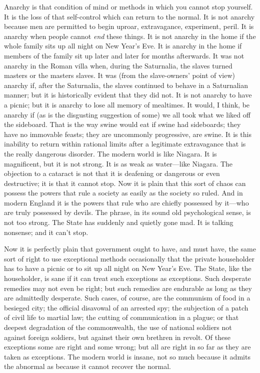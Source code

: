 \documentclass{book}
\begin{document}
Anarchy is that condition of mind or methods in which you cannot stop yourself. It is the loss of that self-control which can return to the normal. It is not anarchy because men are permitted to begin uproar, extravagance, experiment, peril. It is anarchy when people cannot \emph{end} these things. It is not anarchy in the home if the whole family sits up all night on New Year’s Eve. It is anarchy in the home if members of the family sit up later and later for months afterwards. It was not anarchy in the Roman villa when, during the Saturnalia, the slaves turned masters or the masters slaves. It was (from the slave-owners’ point of view) anarchy if, after the Saturnalia, the slaves continued to behave in a Saturnalian manner; but it is historically evident that they did not. It is not anarchy to have a picnic; but it is anarchy to lose all memory of mealtimes. It would, I think, be anarchy if (as is the disgusting suggestion of some) we all took what we liked off the sideboard. That is the way swine would eat if swine had sideboards; they have no immovable feasts; they are uncommonly progressive, are swine. It is this inability to return within rational limits after a legitimate extravagance that is the really dangerous disorder. The modern world is like Niagara. It is magnificent, but it is not strong. It is as weak as water—like Niagara. The objection to a cataract is not that it is deafening or dangerous or even destructive; it is that it cannot stop. Now it is plain that this sort of chaos can possess the powers that rule a society as easily as the society so ruled. And in modern England it is the powers that rule who are chiefly possessed by it—who are truly possessed by devils. The phrase, in its sound old psychological sense, is not too strong. The State has suddenly and quietly gone mad. It is talking nonsense; and it can’t stop.

Now it is perfectly plain that government ought to have, and must have, the same sort of right to use exceptional methods occasionally that the private householder has to have a picnic or to sit up all night on New Year’s Eve. The State, like the householder, is sane if it can treat such exceptions as exceptions. Such desperate remedies may not even be right; but such remedies are endurable as long as they are admittedly desperate. Such cases, of course, are the communism of food in a besieged city; the official disavowal of an arrested spy; the subjection of a patch of civil life to martial law; the cutting of communication in a plague; or that deepest degradation of the commonwealth, the use of national soldiers not against foreign soldiers, but against their own brethren in revolt. Of these exceptions some are right and some wrong; but all are right in so far as they are taken as exceptions. The modern world is insane, not so much because it admits the abnormal as because it cannot recover the normal.
\end{document}
